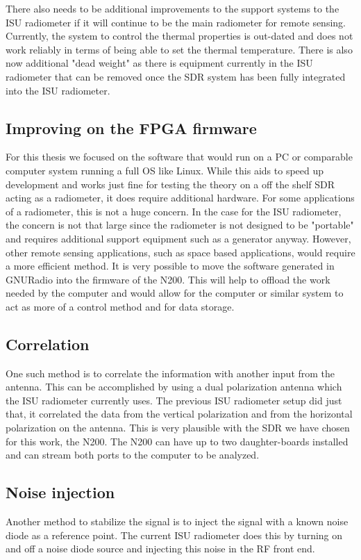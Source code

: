There also needs to be additional improvements to the support systems to the ISU radiometer if it will continue to be the main radiometer for remote sensing.  Currently, the system to control the thermal properties is out-dated and does not work reliably in terms of being able to set the thermal temperature.  There is also now additional "dead weight" as there is equipment currently in the ISU radiometer that can be removed once the SDR system has been fully integrated into the ISU radiometer. 

\subsection{Improving on the FPGA firmware}

For this thesis we focused on the software that would run on a PC or comparable computer system running a full OS like Linux.  While this aids to speed up development and works just fine for testing the theory on a off the shelf SDR acting as a radiometer, it does require additional hardware.  For some applications of a radiometer, this is not a huge concern.  In the case for the ISU radiometer, the concern is not that large since the radiometer is not designed to be "portable" and requires additional support equipment such as a generator anyway.  However, other remote sensing applications, such as space based applications, would require a more efficient method.  It is very possible to move the software generated in GNURadio into the firmware of the N200.  This will help to offload the work needed by the computer and would allow for the computer or similar system to act as more of a control method and for data storage.  

\subsection{Correlation}  
One such method is to correlate the information with another input from the antenna.  This can be accomplished by using a dual polarization antenna which the ISU radiometer currently uses.  The previous ISU radiometer setup did just that, it correlated the data from the vertical polarization and from the horizontal polarization on the antenna.  This is very plausible with the SDR we have chosen for this work, the N200.  The N200 can have up to two daughter-boards installed and can stream both ports to the computer to be analyzed.  

\subsection{Noise injection}
Another method to stabilize the signal is to inject the signal with a known noise diode as a reference point.  The current ISU radiometer does this by turning on and off a noise diode source and injecting this noise in the RF front end.  

